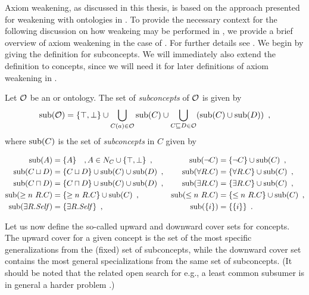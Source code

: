 
Axiom weakening, as discussed in this thesis, is based on the approach presented for weakening with \ALC ontologies in \cite{troquard2018repairing}. To provide the necessary context for the following discussion on how weakeing may be performed in \SROIQ, we provide a brief overview of axiom weakening in the case of \ALC. For further details see \cite{troquard2018repairing}.
%
We begin by giving the definition for subconcepts. We will immediately also extend the definition to \SROIQ concepts, since we will need it for later definitions of axiom weakening in \SROIQ.

\begin{definition}
  Let $\mathcal{O}$ be an \ALC or \SROIQ ontology. The set of \emph{subconcepts} of $\mathcal{O}$ is given by
  \begin{align*}
    {\ensuremath{\operatorname{sub}}}(\mathcal{O}) = \{\top, \bot\} \cup \bigcup_{C(a) \in \mathcal{O}} {\operatorname{sub}}(C) \cup \bigcup_{C \sqsubseteq D \in \mathcal{O}} ( {\operatorname{sub}}(C) \cup {\ensuremath{\operatorname{sub}}}(D) ) \enspace,
  \end{align*}
  where ${\operatorname{sub}}(C)$ is the set of \emph{subconcepts} in $C$ given by
  \begin{widepage}
    \vspace{-5mm}
    \begin{align*}
      {\ensuremath{\operatorname{sub}}}(A) &= \{ A \} \quad , A \in N_C \cup \{ \top, \bot \} \enspace, &
      {\operatorname{sub}}(\lnot C) &= \{ \lnot C \} \cup {\ensuremath{\operatorname{sub}}}(C) \enspace, \\
      {\operatorname{sub}}(C \sqcup D) &= \{ C \sqcup D \} \cup {\ensuremath{\operatorname{sub}}}(C) \cup {\ensuremath{\operatorname{sub}}}(D) \enspace, &
      {\operatorname{sub}}(\forall R.C) &= \{ \forall R.C \} \cup {\ensuremath{\operatorname{sub}}}(C) \enspace, \\
      {\operatorname{sub}}(C \sqcap D) &= \{ C \sqcap D \} \cup {\ensuremath{\operatorname{sub}}}(C) \cup {\ensuremath{\operatorname{sub}}}(D) \enspace, &
      {\operatorname{sub}}(\exists R.C) &= \{ \exists R.C \} \cup {\ensuremath{\operatorname{sub}}}(C) \enspace, \\
      {\operatorname{sub}}(\geq n~R.C) &= \{ \geq n~R.C \} \cup {\ensuremath{\operatorname{sub}}}(C) \enspace, &
      {\operatorname{sub}}(\leq n~R.C) &= \{ \leq n~R.C \} \cup {\ensuremath{\operatorname{sub}}}(C) \enspace, \\
      {\operatorname{sub}}(\exists R.\mathit{Self}) &= \{ \exists R.\mathit{Self} \} \enspace, &
      {\operatorname{sub}}(\{i\}) &= \{ \{i\} \} \enspace.
    \end{align*}
  \end{widepage}
\end{definition}

Let us now define the so-called upward and downward cover sets for concepts. The upward cover for a given concept is the set of the most specific generalizations from the (fixed) set of subconcepts, while the downward cover set contains the most general specializations from the same set of subconcepts. (It should be noted that the related open search for e.g., a least common subsumer is in general a harder problem \cite{baader2003least}.)

